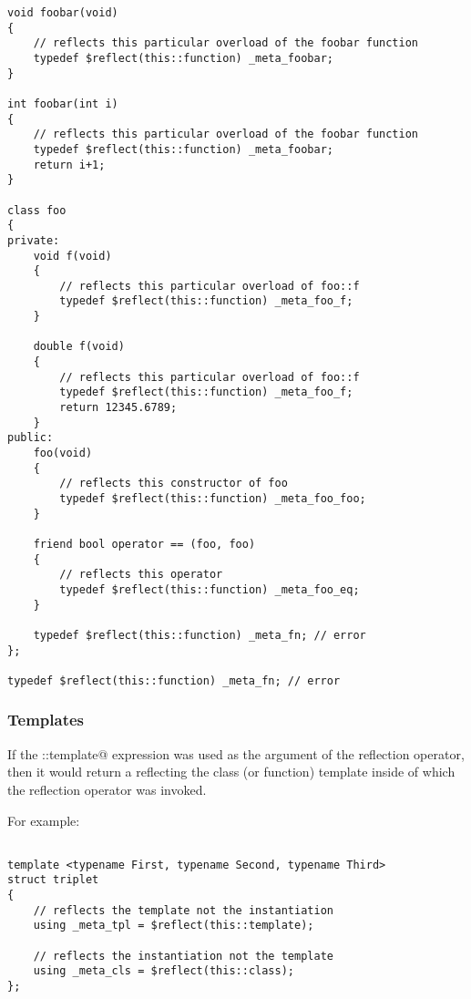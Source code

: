 \begin{verbatim}
void foobar(void)
{
	// reflects this particular overload of the foobar function
	typedef $reflect(this::function) _meta_foobar;
}

int foobar(int i)
{
	// reflects this particular overload of the foobar function
	typedef $reflect(this::function) _meta_foobar;
	return i+1;
}

class foo
{
private:
	void f(void)
	{
		// reflects this particular overload of foo::f
		typedef $reflect(this::function) _meta_foo_f;
	}

	double f(void)
	{
		// reflects this particular overload of foo::f
		typedef $reflect(this::function) _meta_foo_f;
		return 12345.6789;
	}
public:
	foo(void)
	{
		// reflects this constructor of foo
		typedef $reflect(this::function) _meta_foo_foo;
	}

	friend bool operator == (foo, foo)
	{
		// reflects this operator
		typedef $reflect(this::function) _meta_foo_eq;
	}

	typedef $reflect(this::function) _meta_fn; // error
};

typedef $reflect(this::function) _meta_fn; // error
\end{verbatim}

\subsubsection{Templates}

If the \verb@this::template@ expression was used as the argument of the reflection
operator, then it would return a  reflecting the class (or function)
template inside of which the reflection operator was invoked.

For example:

\begin{verbatim}

template <typename First, typename Second, typename Third>
struct triplet
{
	// reflects the template not the instantiation
	using _meta_tpl = $reflect(this::template);

	// reflects the instantiation not the template
	using _meta_cls = $reflect(this::class);
};
\end{verbatim}
